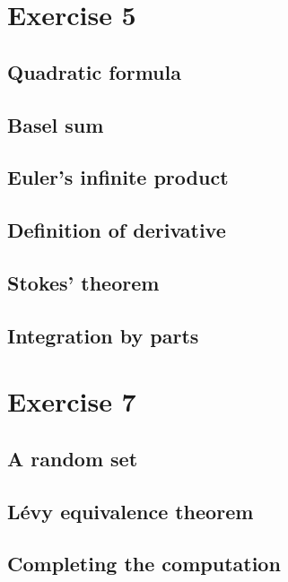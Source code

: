 \documentclass[11pt]{amsart}
\begin{document}
\section{Exercise 5}

\subsection{Quadratic formula}


\subsection{Basel sum}


\subsection{Euler's infinite product}


\subsection{Definition of derivative}


\subsection{Stokes' theorem}


\subsection{Integration by parts}



\section{Exercise 7}

\subsection{A random set}


\subsection{L\'evy equivalence theorem}


\subsection{Completing the computation}
\end{document}
